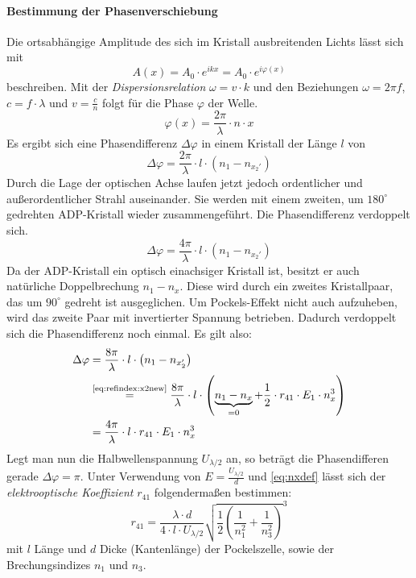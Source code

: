\paragraph{Bestimmung der Phasenverschiebung}
Die ortsabhängige Amplitude des sich im Kristall ausbreitenden Lichts lässt sich mit
\begin{equation}
  A(x) = A_0 \cdot e^{ikx} = A_0 \cdot e^{i \varphi(x)}
\end{equation}
beschreiben. Mit der \emph{Dispersionsrelation} $\omega = v\cdot k$ und den Beziehungen $\omega = 2 \pi f$, $c = f \cdot \lambda$ 
und $v = \frac{c}{n}$ folgt für die Phase $\varphi$ der Welle.
\begin{equation}
  \varphi(x) = \frac{2 \pi}{\lambda} \cdot n \cdot x
\end{equation}
Es ergibt sich eine Phasendifferenz $\Delta \varphi$ in einem Kristall der Länge $l$ von
\begin{equation}
  \Delta \varphi = \frac{2 \pi}{\lambda} \cdot l \cdot \left( n_1 - n_{x_2'} \right) 
\end{equation}
Durch die Lage der optischen Achse laufen jetzt jedoch ordentlicher und außerordentlicher Strahl auseinander. Sie werden mit einem zweiten, 
um $180^\circ$ gedrehten ADP-Kristall wieder zusammengeführt. Die Phasendifferenz verdoppelt sich.
\begin{equation}
  \Delta \varphi = \frac{4 \pi}{\lambda} \cdot l \cdot \left( n_1 - n_{x_2'} \right) 
\end{equation}
Da der ADP-Kristall ein optisch einachsiger Kristall ist, besitzt er auch natürliche Doppelbrechung $n_1 - n_x$. Diese wird durch ein zweites 
Kristallpaar, das um $90^\circ$ gedreht ist ausgeglichen. Um Pockels-Effekt nicht auch aufzuheben, wird das zweite Paar mit invertierter Spannung 
betrieben. Dadurch verdoppelt sich die Phasendifferenz noch einmal. Es gilt also:
\begin{equation}
  \begin{split}
    \Delta \varphi &= \frac{8 \pi}{\lambda} \cdot l \cdot \left( n_1 - n_{x_2'} \right) \\
    &\refeq{eq:refindex:x2new} \frac{8 \pi}{\lambda} \cdot l \cdot \left( \underbrace{n_1 - n_x}_{=0} + \frac{1}{2} \cdot r_{41} \cdot E_1 \cdot n_x^3 \right) \\
    & = \frac{4 \pi}{\lambda} \cdot l \cdot r_{41} \cdot E_1 \cdot n_x^3  
  \end{split}
\end{equation}
Legt man nun die Halbwellenspannung $U_{\lambda/2}$ an, so beträgt die Phasendifferen gerade $\Delta \varphi = \pi$.
Unter Verwendung von $E=\frac{U_{\lambda/2}}{d}$ und \autoref{eq:nxdef} lässt sich der \emph{elektrooptische Koeffizient} $r_{41}$ folgendermaßen bestimmen:
\begin{equation}
  \label{eq:r41}
  r_{41} = \frac{\lambda \cdot d}{4 \cdot l \cdot U_{\lambda/2}} \sqrt{\frac{1}{2} \left( \frac{1}{n_1^2} + \frac{1}{n_3^2} \right) }^3
\end{equation}
mit $l$ Länge und $d$ Dicke (Kantenlänge) der Pockelszelle, sowie der Brechungsindizes $n_1$ und $n_3$.

